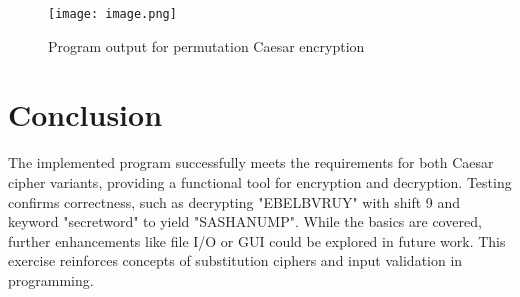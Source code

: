 \begin{figure}[h]
\centering
\texttt{[image: image.png]}
\caption{Program output for permutation Caesar encryption}
\end{figure}

\section{Conclusion}

The implemented program successfully meets the requirements for both Caesar cipher variants, providing a functional tool for encryption and decryption. Testing confirms correctness, such as decrypting "EBELBVRUY" with shift 9 and keyword "secretword" to yield "SASHANUMP". While the basics are covered, further enhancements like file I/O or GUI could be explored in future work. This exercise reinforces concepts of substitution ciphers and input validation in programming.
